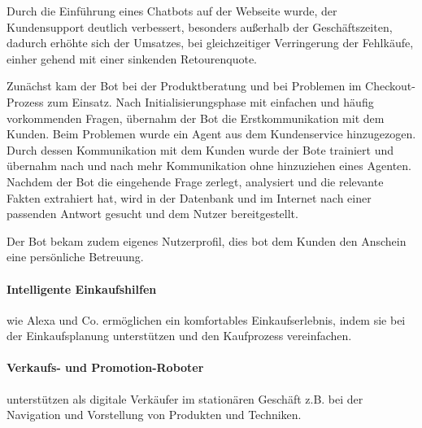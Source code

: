Durch die Einführung eines Chatbots auf der Webseite wurde, der Kundensupport deutlich verbessert, besonders außerhalb der Geschäftszeiten, dadurch erhöhte sich der Umsatzes, bei gleichzeitiger Verringerung der Fehlkäufe, einher gehend mit einer sinkenden Retourenquote.\vspace{0.2cm}

Zunächst kam der Bot bei der Produktberatung und bei Problemen im Checkout-Prozess zum Einsatz. Nach Initialisierungsphase mit einfachen und häufig vorkommenden Fragen, übernahm der Bot die Erstkommunikation mit dem Kunden. Beim Problemen wurde ein Agent aus dem Kundenservice hinzugezogen. Durch dessen Kommunikation mit dem Kunden wurde der Bote trainiert und übernahm nach und nach mehr Kommunikation ohne hinzuziehen eines Agenten. Nachdem der Bot die eingehende Frage zerlegt, analysiert und die relevante Fakten extrahiert hat, wird in der Datenbank und im Internet nach einer passenden Antwort gesucht und dem Nutzer bereitgestellt.\vspace{0.2cm}

Der Bot bekam zudem eigenes Nutzerprofil, dies bot dem Kunden den Anschein eine persönliche Betreuung.

\paragraph{Intelligente Einkaufshilfen} wie Alexa und Co. ermöglichen ein komfortables Einkaufserlebnis, indem sie bei der Einkaufsplanung unterstützen und den Kaufprozess vereinfachen.

\paragraph{Verkaufs- und Promotion-Roboter} unterstützen als digitale Verkäufer im stationären Geschäft z.B. bei der Navigation und Vorstellung von Produkten und Techniken.